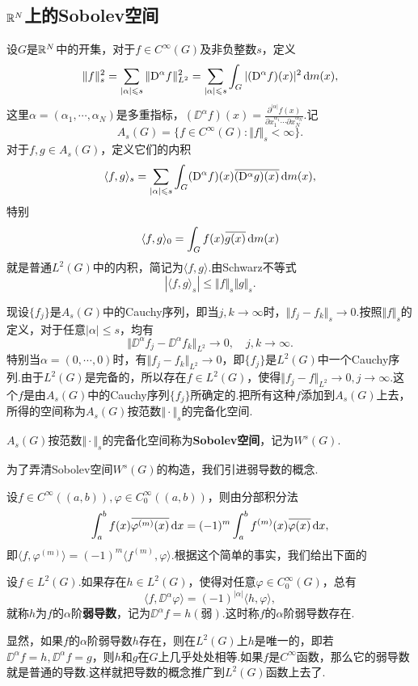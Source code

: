 \subsection{$\mathbb R^N$上的Sobolev空间}
设$G$是$\mathbb R^N$中的开集，对于$f\in C^\infty(G)$及非负整数$s$，定义
\[\Vert f\Vert_s^2=\sum_{|\alpha|\leqslant s}\Vert\mathrm D^\alpha f\Vert_{L^2}^2=\sum_{|\alpha|\leqslant s}\int_G|(\mathrm D^\alpha f)(x)|^2\mathop{}\!\mathrm{d} m(x),\]
这里$\alpha=(\alpha_1,\cdots,\alpha_N)$是多重指标，$(\DD^\alpha f)(x)=\frac{\partial^{|\alpha|}f(x)}{\partial x_1^{\alpha_1}\cdots\partial x_N^{\alpha_N}}$.记
\[A_s(G)=\{f\in C^\infty(G)\colon\Vert f\Vert_s<\infty\}.\]
对于$f,g\in A_s(G)$，定义它们的内积
\[\langle f,g\rangle_s=\sum_{|\alpha|\leqslant s}\int_G (\mathrm D^\alpha f)(x){}\mkern1mu\overline{\mkern-1mu(\mathrm D^\alpha g)(x)}\mathop{}\!\mathrm{d} m(x),\]
特别
\[\langle f,g\rangle_0=\int_G f(x){}\mkern1mu\overline{\mkern-1mug(x)}\mathop{}\!\mathrm{d} m(x)\]
就是普通$L^2(G)$中的内积，简记为$\langle f,g\rangle$.由Schwarz不等式
\[|\langle f,g\rangle_s|\le\Vert f\Vert_s \Vert g\Vert_s.\]

现设$\{f_j\}$是$A_s(G)$中的Cauchy序列，即当$j,k\to\infty$时，$\Vert f_j-f_k\Vert_s\to0$.按照$\Vert f\Vert_s$的定义，对于任意$|\alpha|\le s$，均有
\[\Vert\DD^\alpha f_j-\DD^\alpha f_k\Vert_{L^2}\to0,\quad j,k\to\infty.\]
特别当$\alpha=(0,\cdots,0)$时，有$\Vert f_j-f_k\Vert_{L^2}\to0$，即$\{f_j\}$是$L^2(G)$中一个Cauchy序列.由于$L^2(G)$是完备的，所以存在$f\in L^2(G)$，使得$\Vert f_j-f\Vert_{L^2}\to0,j\to\infty$.这个$f$是由$A_s(G)$中的Cauchy序列$\{f_j\}$所确定的.把所有这种$f$添加到$A_s(G)$上去，所得的空间称为$A_s(G)$按范数$\Vert\cdot\Vert_s$的完备化空间.
\begin{definition}\label{def6.1.2}
	$A_s(G)$按范数$\Vert\cdot\Vert_s$的完备化空间称为\textbf{Sobolev空间}，记为$W^s(G)$.
\end{definition}
为了弄清Sobolev空间$W^s(G)$的构造，我们引进弱导数的概念.

设$f\in C^\infty((a,b)),\varphi\in C_0^\infty((a,b))$，则由分部积分法
\[\int_{a}^{b}f(x){}\mkern1mu\overline{\mkern-1mu\varphi^{(m)}(x)}\mathop{}\!\mathrm dx=(-1)^m\int_{a}^{b}f^{(m)}(x){}\mkern1mu\overline{\mkern-1mu\varphi(x)}\mathop{}\!\mathrm dx,\]
即$\langle f,\varphi^{(m)}\rangle=(-1)^m\langle f^{(m)},\varphi\rangle$.根据这个简单的事实，我们给出下面的
\begin{definition}\label{def6.1.3}
	设$f\in L^2(G)$.如果存在$h\in L^2(G)$，使得对任意$\varphi\in C_0^\infty(G)$，总有
	\[\langle f,\DD^\alpha \varphi\rangle=(-1)^{|\alpha|}\langle h,\varphi\rangle,\]
	就称$h$为$f$的$\alpha$阶\textbf{弱导数}，记为$\DD^\alpha f=h(\text{弱})$.这时称$f$的$\alpha$阶弱导数存在.
\end{definition}
显然，如果$f$的$\alpha$阶弱导数$h$存在，则在$L^2(G)$上$h$是唯一的，即若$\DD^\alpha f=h,\DD^\alpha f=g$，则$h$和$g$在$G$上几乎处处相等.如果$f$是$C^\infty$函数，那么它的弱导数就是普通的导数.这样就把导数的概念推广到$L^2(G)$函数上去了.

